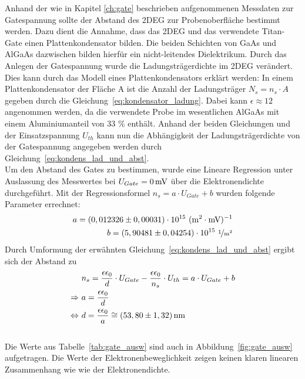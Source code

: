Anhand der wie in Kapitel \ref{ch:gate} beschrieben aufgenommenen Messdaten zur Gatespannung sollte der Abstand des 2DEG zur Probenoberfläche bestimmt werden. Dazu dient die Annahme, dass das 2DEG und das verwendete Titan-Gate einen Plattenkondensator bilden. Die beiden Schichten von GaAs und AlGaAs dazwischen bilden hierfür ein nicht-leitendes Dielektrikum. 
Durch das Anlegen der Gatespannung wurde die Ladungsträgerdichte im 2DEG verändert.  Dies kann durch das Modell eines Plattenkondensators erklärt werden: In einem Plattenkondensator der Fläche A ist die Anzahl der Ladungsträger $N_s=n_s \cdot A$ gegeben durch die Gleichung~\eqref{eq:kondensator_ladung}. Dabei kann $\epsilon \approx 12$ angenommen werden, da die verwendete Probe im wesentlichen AlGaAs mit einem Aluminiumanteil von 33 \% enthält. Anhand der beiden Gleichungen und der Einsatzspannung $U_{th}$ kann nun die Abhängigkeit der Ladungsträgerdichte von der Gatespannung angegeben werden durch Gleichung~\eqref{eq:kondens_lad_und_abst}.\\

Um den Abstand des Gates zu bestimmen, wurde eine Lineare Regression unter Auslassung des Messwertes bei $U_{Gate}=\unit[0]{mV}$ über die Elektronendichte durchgeführt. Mit der Regressionsformel $n_s=a\cdot U_{Gate} + b$ wurden folgende Parameter errechnet:
\begin{align}
a = ( 0,012326 \pm 0,00031)\cdot 10^{15} ~ \unit{(m^2 \cdot mV)^{-1}}\\
b=( 5,90481 \pm 0,04254 )\cdot 10^{15} ~ \unitfrac{1}{m^2}
\end{align}
Durch Umformung der erwähnten Gleichung~\eqref{eq:kondens_lad_und_abst} ergibt sich der Abstand zu
\begin{align}
& n_s=\frac{\epsilon \epsilon_0}{d}\cdot U_{Gate} - \frac{\epsilon \epsilon_0}{n_s} \cdot U_{th}= a \cdot U_{Gate} + b \\
\Rightarrow~ & a=\frac{\epsilon \epsilon_0}{d}\\
\Leftrightarrow~ & d=\frac{\epsilon \epsilon_0}{a} \cong \unit[(53,80 \pm 1,32)]{nm}
\end{align}\\

Die Werte aus Tabelle~\ref{tab:gate_ausw} sind auch in Abbildung~\ref{fig:gate_ausw} aufgetragen. Die Werte der Elektronenbeweglichkeit zeigen keinen klaren linearen Zusammenhang wie wie der Elektronendichte. %

